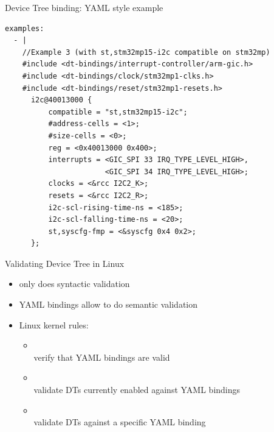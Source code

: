 \begin{frame}[fragile]{Device Tree binding: YAML style example}
    \begin{block}{}
      {\fontsize{5}{6}\selectfont
\begin{verbatim}
examples:
  - |
    //Example 3 (with st,stm32mp15-i2c compatible on stm32mp)
    #include <dt-bindings/interrupt-controller/arm-gic.h>
    #include <dt-bindings/clock/stm32mp1-clks.h>
    #include <dt-bindings/reset/stm32mp1-resets.h>
      i2c@40013000 {
          compatible = "st,stm32mp15-i2c";
          #address-cells = <1>;
          #size-cells = <0>;
          reg = <0x40013000 0x400>;
          interrupts = <GIC_SPI 33 IRQ_TYPE_LEVEL_HIGH>,
                       <GIC_SPI 34 IRQ_TYPE_LEVEL_HIGH>;
          clocks = <&rcc I2C2_K>;
          resets = <&rcc I2C2_R>;
          i2c-scl-rising-time-ns = <185>;
          i2c-scl-falling-time-ns = <20>;
          st,syscfg-fmp = <&syscfg 0x4 0x2>;
      };
\end{verbatim}
      }
    \end{block}
\end{frame}

\begin{frame}{Validating Device Tree in Linux}
  \begin{itemize}
  \item {} only does syntactic validation
  \item YAML bindings allow to do semantic validation
  \item Linux kernel  rules:
    \begin{itemize}
    \item {}\\
      verify that YAML bindings are valid
    \item {}\\
      validate DTs currently enabled against YAML bindings
    \item {}\\
      validate DTs against a specific YAML binding
    \end{itemize}
  \end{itemize}
\end{frame}


